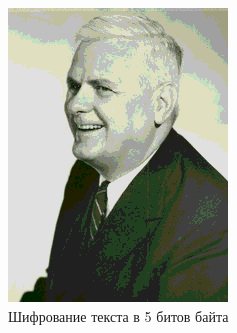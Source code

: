 \documentclass[10pt,a4paper,final]{article} %
\begin{document}
\begin{figure}[h!]
\begin{minipage}{0.3\textwidth}
		\includegraphics[width=\linewidth]{img/Haskell_5}
		\caption{Шифрование текста в 5 битов байта}
	\end{minipage}
\end{figure}

\newpage
\end{document}
